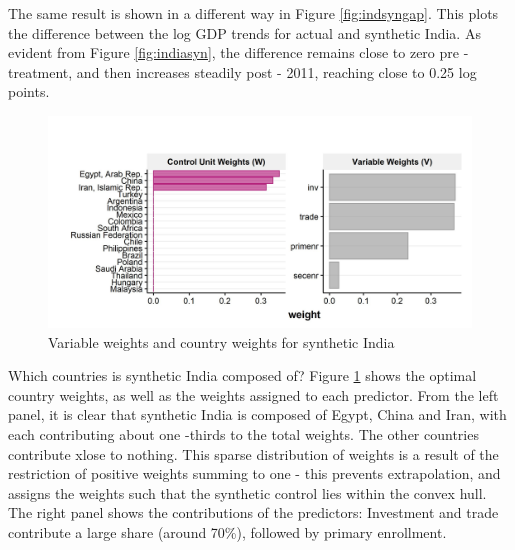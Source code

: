 \documentclass[12pt,nobind, a4paper]{reedthesis}
\begin{document}
 The same result is shown in a different way in Figure \ref{fig:indsyngap}. This plots the difference between the log GDP trends for actual and synthetic India. As evident from Figure \ref{fig:indiasyn}, the difference remains close to zero pre - treatment, and then increases steadily post - 2011, reaching close to 0.25 log points.
 \linebreak
 \begin{figure}

 {\centering \includegraphics[width=1\linewidth]{figure/weights} 

 }

 \caption{Variable weights and country weights for synthetic India}\label{fig:weights}
 \end{figure}
 Which countries is synthetic India composed of? Figure \ref{fig:weights} shows the optimal country weights, as well as the weights assigned to each predictor. From the left panel, it is clear that synthetic India is composed of Egypt, China and Iran, with each contributing about one -thirds to the total weights. The other countries contribute xlose to nothing. This sparse distribution of weights is a result of the restriction of positive weights summing to one - this prevents extrapolation, and assigns the weights such that the synthetic control lies within the convex hull. The right panel shows the contributions of the predictors: Investment and trade contribute a large share (around 70\%), followed by primary enrollment.
 \linebreak
\end{document}
